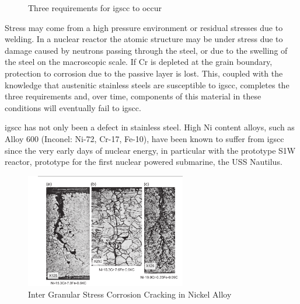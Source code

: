 \begin{figure}
  \begin{center}
\caption{Three requirements for \acrshort{igscc} to occur}
\label{fig:igsccrequirements}
\end{center}
\end{figure}

Stress may come from a high pressure environment or residual stresses due to welding.  In a nuclear reactor the atomic structure may be under stress due to damage caused by neutrons passing through the steel, or due to the swelling of the steel on the macroscopic scale.  If Cr is depleted at the grain boundary, protection to corrosion due to the passive layer is lost.  This, coupled with the knowledge that austenitic stainless steels are susceptible to \acrshort{igscc}, completes the three requirements and, over time, components of this material in these conditions will eventually fail to \acrshort{igscc}.

\acrshort{igscc} has not only been a defect in stainless steel.  High Ni content alloys, such as Alloy 600 (Inconel:  Ni-72, Cr-17, Fe-10),  have been known to suffer from \acrshort{igscc} since the very early days of nuclear energy, in particular with the prototype S1W reactor, prototype for the first nuclear powered submarine, the USS Nautilus.

\begin{figure}
  \begin{center}
    \includegraphics[width=7.0cm]{chapters/background_austenitic_steels_in_nuclear/images/igscc_nickel_alloy600.png}
    \caption{Inter Granular Stress Corrosion Cracking in Nickel Alloy\cite{staehlecoriou}}
    \label{image:igsccni}
  \end{center}
\end{figure}

